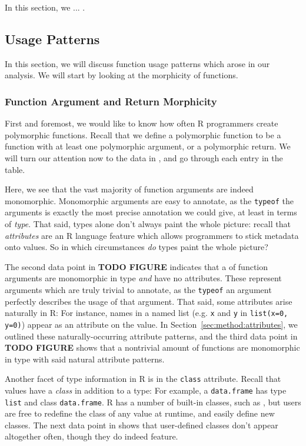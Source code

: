 \documentclass[acmsmall,10pt,review,anonymous]{acmart}\settopmatter{printfolios=true,printccs=false,printacmref=false}
\begin{document}
In this section, we ... .

%
%
%
%
\subsection{Usage Patterns}

In this section, we will discuss function usage patterns which arose in our analysis.
We will start by looking at the morphicity of functions.

\subsubsection{Function Argument and Return Morphicity}

First and foremost, we would like to know how often R programmers create polymorphic functions.
Recall that we define a polymorphic function to be a function with at least one polymorphic argument, or a polymorphic return.
We will turn our attention now to the data in , and go through each entry in the table.

Here, we see that the vast majority of function arguments are indeed monomorphic.
Monomorphic arguments are easy to annotate, as the {\tt typeof} the arguments is exactly the most precise annotation we could give, at least in terms of \textit{type}.
That said, types alone don't always paint the whole picture:
recall that \textit{attributes} are an R language feature which allows programmers to stick metadata onto values.
So in which circumstances \textit{do} types paint the whole picture?

The second data point in \textbf{TODO FIGURE} indicates that a  of function arguments are monomorphic in type \textit{and} have no attributes.
These represent arguments which are truly trivial to annotate, as the {\tt typeof} an argument perfectly describes the usage of that argument.
That said, some attributes arise naturally in R:
For instance, names in a named list (e.g. {\tt x} and {\tt y} in {\tt list(x=0, y=0)}) appear as an attribute on the value.
In Section~\ref{sec:method:attributes}, we outlined these naturally-occurring attribute patterns, and the third data point in \textbf{TODO FIGURE} shows that a nontrivial amount of functions are monomorphic in type with said natural attribute patterns.

Another facet of type information in R is in the {\tt class} attribute.
Recall that values have a \textit{class} in addition to a type:
For example, a {\tt data.frame} has type {\tt list} and class {\tt data.frame}.
R has a number of built-in classes, such as , but users are free to redefine the class of any value at runtime, and easily define new classes.
The next data point in  shows that user-defined classes don't appear altogether often, though they do indeed feature.
\end{document}
